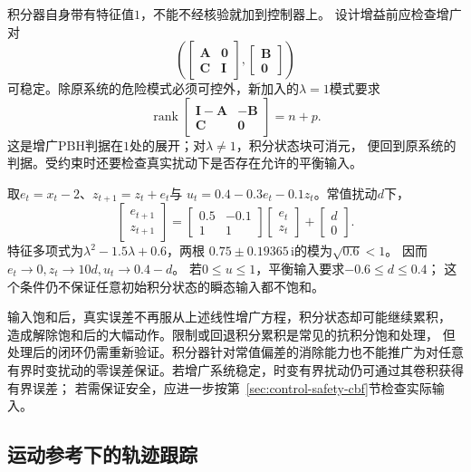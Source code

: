 积分器自身带有特征值$1$，不能不经核验就加到控制器上。
设计增益前应检查增广对
\[
  \left(
   \begin{bmatrix}\bm A&\bm0\\\bm C&\bm I\end{bmatrix},
   \begin{bmatrix}\bm B\\\bm0\end{bmatrix}\right)
\]
可稳定。除原系统的危险模式必须可控外，新加入的$\lambda=1$模式要求
\[
  \operatorname{rank}
  \begin{bmatrix}\bm I-\bm A&-\bm B\\\bm C&\bm0\end{bmatrix}=n+p.
\]
这是增广PBH判据在$1$处的展开；对$\lambda\neq1$，积分状态块可消元，
便回到原系统的判据。受约束时还要检查真实扰动下是否存在允许的平衡输入。

\begin{example}[温度系统的积分增广]
\label{ex:control-temperature-integral}
取$e_t=x_t-2$、$z_{t+1}=z_t+e_t$与
$u_t=0.4-0.3e_t-0.1z_t$。常值扰动$d$下，
\[
  \begin{bmatrix}e_{t+1}\\z_{t+1}\end{bmatrix}
  =\begin{bmatrix}0.5&-0.1\\1&1\end{bmatrix}
   \begin{bmatrix}e_t\\z_t\end{bmatrix}
   +\begin{bmatrix}d\\0\end{bmatrix}.
\]
特征多项式为$\lambda^2-1.5\lambda+0.6$，两根
$0.75\pm0.19365\,\mathrm i$的模为$\sqrt{0.6}<1$。
因而$e_t\to0,z_t\to10d,u_t\to0.4-d$。
若$0\leq u\leq1$，平衡输入要求$-0.6\leq d\leq0.4$；
这个条件仍不保证任意初始积分状态的瞬态输入都不饱和。
\end{example}

输入饱和后，真实误差不再服从上述线性增广方程，积分状态却可能继续累积，
造成解除饱和后的大幅动作。限制或回退积分累积是常见的抗积分饱和处理，
但处理后的闭环仍需重新验证。积分器针对常值偏差的消除能力也不能推广为对任意
有界时变扰动的零误差保证。若增广系统稳定，时变有界扰动仍可通过其卷积获得有界误差；
若需保证安全，应进一步按第~\ref{sec:control-safety-cbf}节检查实际输入。

\subsection{运动参考下的轨迹跟踪}
